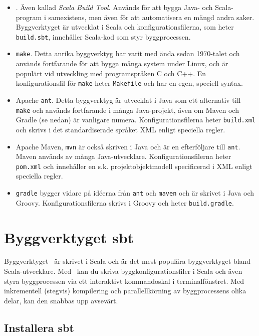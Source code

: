 \begin{itemize}
\item \sbt. Även kallad \textit{Scala Build Tool}. Används för att bygga Java- och Scala-program i samexistens, men även för att automatisera en mängd andra saker. Byggverktyget är utvecklat i Scala och konfigurationsfilerna, som heter \texttt{build.sbt}, innehåller Scala-kod som styr byggprocessen. 

\item \texttt{make}. Detta anrika byggverktyg har varit med ända sedan 1970-talet och används fortfarande för att bygga många system under Linux, och är populärt vid utveckling med programspråken C och C++. En konfigurationsfil för \texttt{make} heter \texttt{Makefile} och har en egen, speciell syntax.

\item Apache \texttt{ant}. Detta byggverktyg är utvecklat i Java som ett alternativ till \texttt{make} och används fortfarande i många Java-projekt, även om Maven och Gradle (se nedan) är vanligare numera. Konfigurationsfilerna heter \texttt{build.xml} och skrivs i det standardiserade språket XML enligt  speciella regler.

\item Apache Maven, \texttt{mvn} är också skriven i Java och är en efterföljare till \texttt{ant}. Maven används av många Java-utvecklare. Konfigurationsfilerna heter \texttt{pom.xml} och innehåller en s.k. projektobjektmodell specificerad i XML enligt  speciella regler.

\item \texttt{gradle} bygger vidare på idéerna från \texttt{ant} och \texttt{maven} och är skrivet i Java och Groovy.  Konfigurationsfilerna skrivs i Groovy och heter \texttt{build.gradle}.  

\end{itemize} 

\section{Byggverktyget sbt}

Byggverktyget \sbt\ är skrivet i Scala och är det mest populära byggverktyget bland Scala-utvecklare. Med \sbt\ kan du skriva byggkonfigurationsfiler i Scala och även styra byggprocessen via ett interaktivt kommandoskal i terminalfönstret. Med inkrementell (stegvis) kompilering och parallellkörning av byggprocessens olika delar, kan den snabbas upp avsevärt.    


\subsection{Installera sbt}

